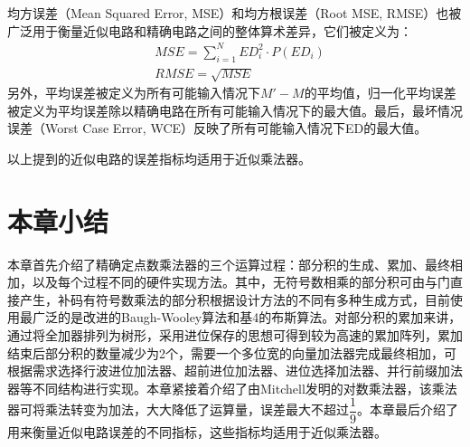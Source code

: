 均方误差（Mean Squared Error, MSE）和均方根误差（Root MSE, RMSE）也被广泛用于衡量近似电路和精确电路之间的整体算术差异，它们被定义为：
\begin{align}
    & MSE = \sum _{i=1}^{N}ED_{i}^{2}\cdot P(ED_{i}) \label{AC:Arith:MSE} \\
    & RMSE = \sqrt {MSE} \label{AC:Arith:RMSE}
\end{align}
另外，平均误差被定义为所有可能输入情况下$M \prime - M$的平均值，归一化平均误差被定义为平均误差除以精确电路在所有可能输入情况下的最大值。最后，最坏情况误差（Worst Case Error, WCE）反映了所有可能输入情况下ED的最大值。

以上提到的近似电路的误差指标均适用于近似乘法器。

\section{本章小结}

本章首先介绍了精确定点数乘法器的三个运算过程：部分积的生成、累加、最终相加，以及每个过程不同的硬件实现方法。其中，无符号数相乘的部分积可由与门直接产生，补码有符号数乘法的部分积根据设计方法的不同有多种生成方式，目前使用最广泛的是改进的Baugh-Wooley算法和基4的布斯算法。对部分积的累加来讲，通过将全加器排列为树形，采用进位保存的思想可得到较为高速的累加阵列，累加结束后部分积的数量减少为2个，需要一个多位宽的向量加法器完成最终相加，可根据需求选择行波进位加法器、超前进位加法器、进位选择加法器、并行前缀加法器等不同结构进行实现。本章紧接着介绍了由Mitchell发明的对数乘法器，该乘法器可将乘法转变为加法，大大降低了运算量，误差最大不超过$\dfrac{1}{9}$。本章最后介绍了用来衡量近似电路误差的不同指标，这些指标均适用于近似乘法器。